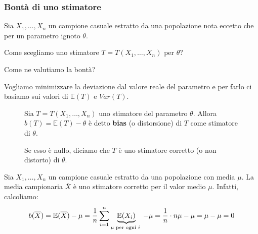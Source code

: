 \documentclass[a4paper]{article}
\theoremstyle{break}
\theoremstyle{break}
\theoremstyle{break}
\theoremstyle{break}
\begin{document}
\subsubsection{Bontà di uno stimatore}
Sia \( X_1, \ldots, X_n \) un campione casuale estratto da una popolazione nota eccetto
che per un parametro ignoto \( \theta \).

\noindent Come scegliamo uno stimatore \( T = T(X_1, \ldots, X_n) \) per \( \theta \)?

\noindent Come ne valutiamo la bontà?

\vspace{1em}
\noindent Vogliamo minimizzare la deviazione dal valore reale del parametro e per farlo ci
basiamo sui valori di \( \mathbb{E}(T) \) e \( Var(T) \).

\begin{figure}[H]
  \begin{definition}[Bias]
    Sia \( T = T(X_1, \ldots, X_n) \) uno stimatore del parametro \( \theta \). Allora
    \( b(T) = \mathbb{E}(T) - \theta \) è detto \textbf{bias} (o distorsione) di \( T \)
    come stimatore di \( \theta \).

    \noindent Se esso è nullo, diciamo che \( T \) è uno stimatore corretto (o non distorto)
    di \( \theta \).
  \end{definition}
\end{figure}

\begin{example}
  Sia \( X_1, \ldots, X_n \) un campione casuale estratto da una popolazione con media
  \( \mu \). La media campionaria \( \overline{X} \) è uno stimatore corretto per il valor
  medio \( \mu \). Infatti, calcoliamo:
  \[
    b(\overline{X}) = \mathbb{E}(\overline{X}) - \mu = \frac{1}{n} \sum_{i=1}^n \underbrace{\mathbb{E}(X_i)}_{\text{\( \mu \) per ogni \( i \) }} - \mu =
    \frac{1}{n} \cdot n \mu - \mu = \mu - \mu = 0
  \] 
\end{example}
\end{document}
